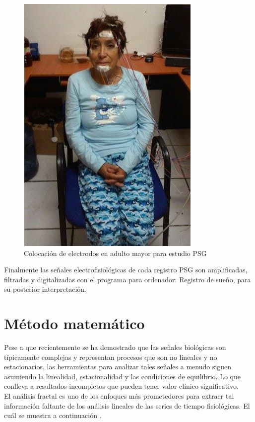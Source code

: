 \documentclass[letterpaper,titlepage,12pt,draft]{report}
\begin{document}
\begin{figure}[H]
\begin{center}
\includegraphics[scale=0.5]{v0.jpg}
\caption{Colocaci\'on de electrodos en adulto mayor para estudio PSG}
\label{fig:foto}
\end{center}
\end{figure}

Finalmente las se\~nales electrofisiol\'ogicas de cada registro PSG son amplificadas, filtradas y digitalizadas con el programa para ordenador: Registro de sue\~no, para su posterior interpretaci\'on.

\section{M\'etodo matem\'atico}

Pese a que recientemente se ha demostrado que las se\~nales biol\'ogicas son t\'ipicamente complejas y representan procesos que son no lineales y no estacionarios, las herramientas para analizar tales se\~nales a menudo siguen asumiendo la linealidad, estacionalidad y las condiciones de equilibrio. Lo que conlleva a resultados incompletos que pueden tener valor cl\'inico significativo.\\

El an\'alisis fractal es uno de los enfoques m\'as prometedores para extraer tal informaci\'on faltante de los an\'alisis lineales de las series de tiempo fisiol\'ogicas. El cu\'al se muestra a continuaci\'on \cite{Peng}. 
\end{document}

